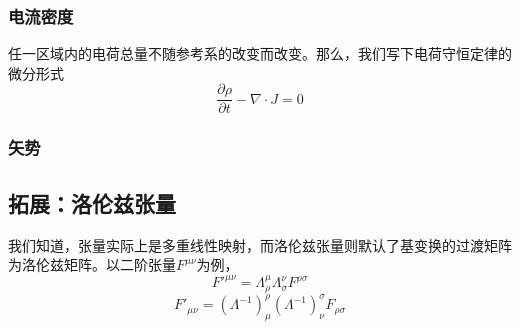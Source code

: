 \subsubsection{电流密度}
任一区域内的电荷总量不随参考系的改变而改变。那么，我们写下电荷守恒定律的微分形式
\begin{equation}
\frac{\partial\rho}{\partial t}-\nabla \cdot J=0
\end{equation}

\subsubsection{矢势}
\subsection{拓展：洛伦兹张量}
我们知道，张量实际上是多重线性映射，而洛伦兹张量则默认了基变换的过渡矩阵为洛伦兹矩阵。以二阶张量$F^{\mu\nu} $为例，
\begin{equation}
F'^{\mu\nu}=\Lambda_\rho^\mu \Lambda_\sigma^\nu F^{\rho\sigma}  
\end{equation}
\begin{equation}
F'_{\mu\nu}=(\Lambda^{-1})_\mu^\rho (\Lambda^{-1})_\nu^\sigma F_{\rho\sigma}
\end{equation}


